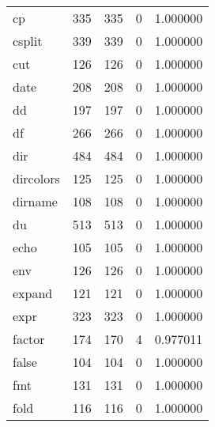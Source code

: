 \begin{longtable}{lrrrr}
cp        &                     335 &              335 &                 0 &                     1.000000 \\
csplit    &                     339 &              339 &                 0 &                     1.000000 \\
cut       &                     126 &              126 &                 0 &                     1.000000 \\
date      &                     208 &              208 &                 0 &                     1.000000 \\
dd        &                     197 &              197 &                 0 &                     1.000000 \\
df        &                     266 &              266 &                 0 &                     1.000000 \\
dir       &                     484 &              484 &                 0 &                     1.000000 \\
dircolors &                     125 &              125 &                 0 &                     1.000000 \\
dirname   &                     108 &              108 &                 0 &                     1.000000 \\
du        &                     513 &              513 &                 0 &                     1.000000 \\
echo      &                     105 &              105 &                 0 &                     1.000000 \\
env       &                     126 &              126 &                 0 &                     1.000000 \\
expand    &                     121 &              121 &                 0 &                     1.000000 \\
expr      &                     323 &              323 &                 0 &                     1.000000 \\
factor    &                     174 &              170 &                 4 &                     0.977011 \\
false     &                     104 &              104 &                 0 &                     1.000000 \\
fmt       &                     131 &              131 &                 0 &                     1.000000 \\
fold      &                     116 &              116 &                 0 &                     1.000000 \\

\end{longtable}
